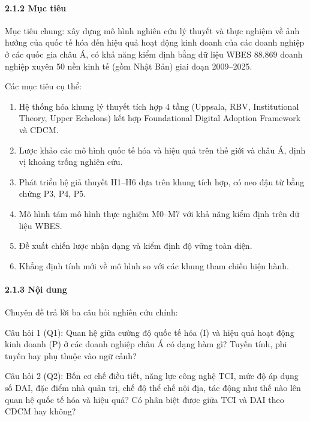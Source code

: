 \documentclass[
  a4paper,
  13pt]{extreport}
\begin{document}
\hypertarget{mux1ee5c-tiuxeau}{%
\paragraph{2.1.2 Mục tiêu}\label{mux1ee5c-tiuxeau}}

Mục tiêu chung: xây dựng mô hình nghiên cứu lý thuyết và thực nghiệm về
ảnh hưởng của quốc tế hóa đến hiệu quả hoạt động kinh doanh của các
doanh nghiệp ở các quốc gia châu Á, có khả năng kiểm định bằng dữ liệu
WBES 88.869 doanh nghiệp xuyên 50 nền kinh tế (gồm Nhật Bản) giai đoạn
2009--2025.

Các mục tiêu cụ thể:

\begin{enumerate}
\def\labelenumi{\arabic{enumi}.}
\item
  Hệ thống hóa khung lý thuyết tích hợp 4 tầng (Uppsala, RBV,
  Institutional Theory, Upper Echelons) kết hợp Foundational Digital
  Adoption Framework và CDCM.
\item
  Lược khảo các mô hình quốc tế hóa và hiệu quả trên thế giới và châu Á,
  định vị khoảng trống nghiên cứu.
\item
  Phát triển hệ giả thuyết H1--H6 dựa trên khung tích hợp, có neo đậu từ
  bằng chứng P3, P4, P5.
\item
  Mô hình tám mô hình thực nghiệm M0--M7 với khả năng kiểm định trên dữ
  liệu WBES.
\item
  Đề xuất chiến lược nhận dạng và kiểm định độ vững toàn diện.
\item
  Khẳng định tính mới về mô hình so với các khung tham chiếu hiện hành.
\end{enumerate}

\hypertarget{nux1ed9i-dung}{%
\paragraph{2.1.3 Nội dung}\label{nux1ed9i-dung}}

Chuyên đề trả lời ba câu hỏi nghiên cứu chính:

Câu hỏi 1 (Q1): Quan hệ giữa cường độ quốc tế hóa (I) và hiệu quả hoạt
động kinh doanh (P) ở các doanh nghiệp châu Á có dạng hàm gì? Tuyến
tính, phi tuyến hay phụ thuộc vào ngữ cảnh?

Câu hỏi 2 (Q2): Bốn cơ chế điều tiết, năng lực công nghệ TCI, mức độ áp
dụng số DAI, đặc điểm nhà quản trị, chế độ thể chế nội địa, tác động như
thế nào lên quan hệ quốc tế hóa và hiệu quả? Có phân biệt được giữa TCI
và DAI theo CDCM hay không?
\end{document}
